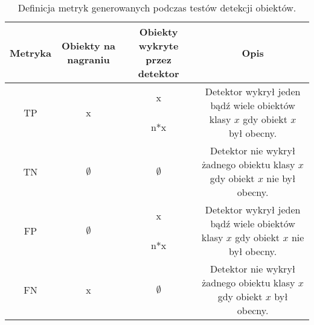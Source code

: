 \begin{table}[H]
    \centering
    \caption{Definicja metryk generowanych podczas testów detekcji obiektów.}
    \begin{tabular}{|c|c|c|c|}
    \hline

    Metryka & Obiekty na nagraniu & Obiekty wykryte przez detektor & Opis \\ \hline



    \multirow{2}{*}{TP} & \multirow{2}{*}{x} & x & \multirow{2}{*}{Detektor wykrył jeden bądź wiele obiektów klasy $x$ gdy obiekt $x$ był obecny.} \\ \cline{3-3}

    & & n*x & \\ \hline


    TN & $\emptyset$ & $\emptyset$ & Detektor nie wykrył żadnego obiektu klasy $x$ gdy obiekt $x$ nie był obecny. \\ \hline
    


    \multirow{2}{*}{FP} & \multirow{2}{*}{$\emptyset$} & x & \multirow{2}{*}{Detektor wykrył jeden bądź wiele obiektów klasy $x$ gdy obiekt $x$ nie był obecny.} \\ \cline{3-3}

    & & n*x & \\ \hline


    
    FN & x & $\emptyset$ & Detektor nie wykrył żadnego obiektu klasy $x$ gdy obiekt $x$ był obecny. \\ \hline

    \end{tabular}
\end{table}